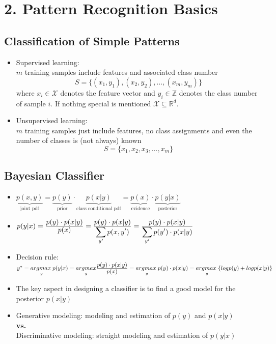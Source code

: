 \section*{2. Pattern Recognition Basics}
\subsection*{Classification of Simple Patterns}
\begin{itemize}
    \item
        Supervised learning:\\
        $m$ training samples include features and associated class number
        $$S = \{(x_1, y_1), (x_2, y_2), \dots, (x_m,y_m)\}$$
        where $x_i \in \mathcal{X}$ denotes the feature vector and $y_i \in \mathbb{Z}$ denotes the class number of sample $i$. If nothing special is mentioned $\mathcal{X} \subseteq \mathbb{R}^d$.
    \item
        Unsupervised learning:\\
        $m$ training samples just include features, no class assignments and even the number of classes is (not always) known
        $$S = \{x_1, x_2, x_3, \dots, x_m\}$$
\end{itemize}

\subsection*{Bayesian Classifier}
\begin{itemize}
    \item
        $\underbrace{p(x, y)}_{\text{joint pdf}} = \underbrace{p(y)}_{\text{prior}} \cdot \underbrace{p(x|y)}_{\text{class conditional pdf}} = \underbrace{p(x)}_{\text{evidence}} \cdot \underbrace{p(y|x)}_{\text{posterior}}$
    \item
        $p(y|x) = \frac{\displaystyle p(y) \cdot p(x|y)}{\displaystyle p(x)} = \frac{\displaystyle p(y) \cdot p(x|y)}{\displaystyle \sum_{y'}p(x, y')} = \frac{\displaystyle p(y) \cdot p(x|y)}{\displaystyle \sum_{y'}p(y') \cdot p(x|y)}$
    \item
        Decision rule:\\
        $ y^* =  \underset{y}{argmax\;} p(y|x) = \underset{y}{argmax} \frac{\displaystyle p(y) \cdot p(x|y)}{\displaystyle p(x)} = \underset{y}{argmax\;} p(y) \cdot p(x|y) = \underset{y}{argmax\;} \{log p(y) + log p(x|y)\}$
    \item
        The key aspect in designing a classifier is to find a good model for the posterior $p(x|y)$
    \item
        Generative modeling: modeling and estimation of $p(y)$ and $p(x|y)$\\
        \textbf{vs.}\\
        Discriminative modeling: straight modeling and estimation of $p(y|x)$
\end{itemize}

